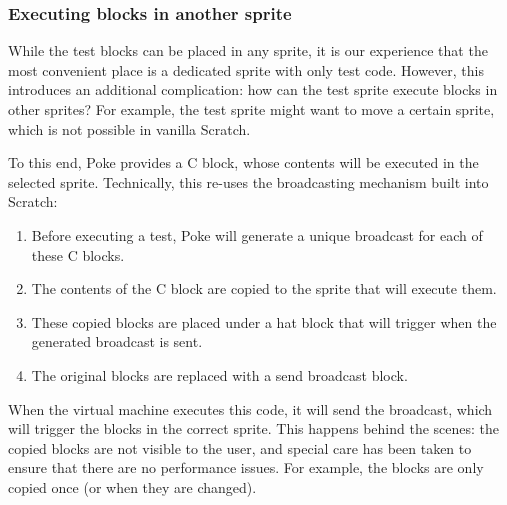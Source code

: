 \documentclass[../main]{subfiles}
\begin{document}
\subsubsection{Executing blocks in another sprite}

\begin{varwidth}{0.5\linewidth}
    \begin{scratch}[scale=0.6]
    \end{scratch}
\end{varwidth}%
\hspace{1em}%
\begin{varwidth}{0.5\linewidth}
    \begin{scratch}[scale=0.6]
    \end{scratch}
\end{varwidth}%

While the test blocks can be placed in any sprite, it is our experience that the most convenient place is a dedicated sprite with only test code.
However, this introduces an additional complication: how can the test sprite execute blocks in other sprites?
For example, the test sprite might want to move a certain sprite, which is not possible in vanilla Scratch.

To this end, Poke provides a C block, whose contents will be executed in the selected sprite.
Technically, this re-uses the broadcasting mechanism built into Scratch:

\begin{enumerate}
    \item Before executing a test, Poke will generate a unique broadcast for each of these C blocks.
    \item The contents of the C block are copied to the sprite that will execute them.
    \item These copied blocks are placed under a hat block that will trigger when the generated broadcast is sent.
    \item The original blocks are replaced with a send broadcast block.
\end{enumerate}

When the virtual machine executes this code, it will send the broadcast, which will trigger the blocks in the correct sprite.
This happens behind the scenes: the copied blocks are not visible to the user, and special care has been taken to ensure that there are no performance issues.
For example, the blocks are only copied once (or when they are changed).
\end{document}
